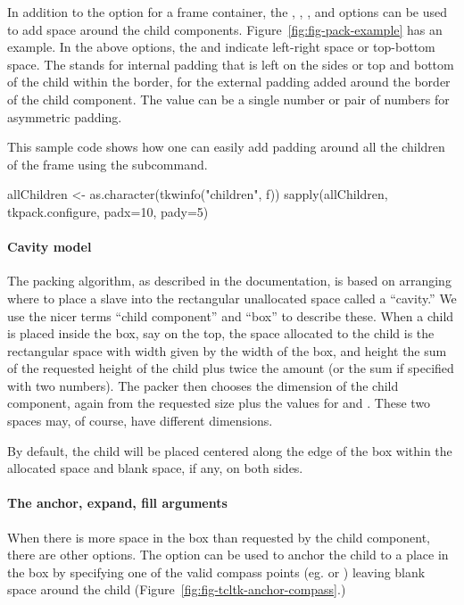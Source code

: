 In addition to the  option for a frame container, the
, , ,
and  options can be used to add space around the
child components. Figure~\ref{fig:fig-pack-example} has an
example. In the above options, the  and  indicate left-right space or
top-bottom space. The  stands for internal padding that is
left on the sides or top and bottom of the child within the border,
for  the external padding added around the border of the
child component. The value can be a single number or pair of numbers
for asymmetric padding.


This sample code shows how one can easily add padding around all the
children of the frame  using the
 subcommand.

\begin{Schunk}
\begin{Sinput}
 allChildren <- as.character(tkwinfo("children", f))
 sapply(allChildren, tkpack.configure,  padx=10, pady=5)
 
\end{Sinput}
\end{Schunk}


\paragraph{Cavity model}
The packing algorithm, as described in the \Tk\/ documentation, is based
on arranging where to place a slave into the rectangular unallocated
space called a ``cavity.'' We use the nicer terms ``child component'' and ``box''
to describe these. When a child is placed inside the box, say on the
top, the space allocated to the child is the rectangular space with
width given by the width of the box, and height the sum of the
requested height of the child plus twice the  amount (or
the sum if specified with two numbers). The packer then chooses the
dimension of the child component, again from the requested size plus
the  values for  and . These two spaces
may, of course, have different dimensions.



By default, the child  will be placed centered along the edge of
the box within the allocated space and blank space, if any, on both
sides. 


\paragraph{The anchor, expand, fill arguments}
When there is more space in the box than requested by the child
component, there are other options. The  option
can be used to anchor the child to a place in the box by specifying
one of the valid compass points (eg.  or )
leaving blank space around the child (Figure~\ref{fig:fig-tcltk-anchor-compass}.)

